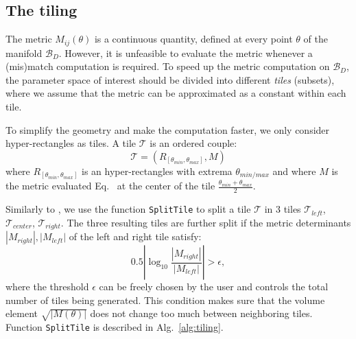\documentclass[twocolumn,showpacs,preprintnumbers,nofootinbib,prd,
superscriptaddress,10pt]{revtex4-2}
\begin{document}

\subsection{The tiling} \label{sec:tiling}

The metric $M_{ij}(\theta)$ is a continuous quantity, defined at every point $\theta$ of the manifold $\mathcal{B}_D$.
However, it is unfeasible to evaluate the metric whenever a (mis)match computation is required.
To speed up the metric computation on $\mathcal{B}_D$, the parameter space of interest should be divided into different {\it tiles} (subsets), where we assume that the metric can be approximated as a constant within each tile.

To simplify the geometry and make the computation faster, we only consider hyper-rectangles as tiles. A tile $\mathcal{T}$ is an ordered couple:
\begin{equation} \label{eq:tile}
	\mathcal{T} = \left(R_{[\theta_{min}, \theta_{max}]}, M \right)
\end{equation}
where $R_{[\theta_{min}, \theta_{max}]}$ is an hyper-rectangles with extrema $\theta_{min/max}$ and where $M$ is the metric evaluated Eq.~ at the center of the tile $\frac{\theta_{min}+\theta_{max}}{2}$.

Similarly to \cite{Hanna:2022zpk}, we use the function \texttt{SplitTile} to split a tile $\mathcal{T}$ in 3 tiles $\mathcal{T}_{left}$, $\mathcal{T}_{center}$, $\mathcal{T}_{right}$.
The three resulting tiles are further split if the metric determinants $|M_{right}|, |M_{left}|$ of the left and right tile satisfy:
\begin{equation}
	0.5\left|\log_{\textrm{10}}\frac{|M_{right}|}{|M_{left}|}\right| > \epsilon,
\end{equation}
where the threshold $\epsilon$ can be freely chosen by the user and controls the total number of tiles being generated.
This condition makes sure that the volume element $\sqrt{|M(\theta)|}$ does not change too much between neighboring tiles.
Function \texttt{SplitTile} is described in Alg.~\ref{alg:tiling}.
\end{document}
